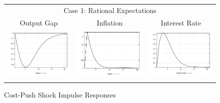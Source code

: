 \begin{figure}
\caption{Cost-Push Shock Impulse Responses}\label{fg:irf_cost}
\vspace*{1pc}
\begin{tabular}{ccc}
\multicolumn{3}{c}{Case 1: Rational Expectations}\\
Output Gap & Inflation & Interest Rate \\ 
\includegraphics[scale=0.28]{results_re/Output_costshock_irf.png} & 
\includegraphics[scale=0.28]{results_re/Inflation_costshock_irf.png} & 
\includegraphics[scale=0.28]{results_re/Interest_Rate_costshock_irf.png} \\ \\ 

\end{tabular}
\end{figure}
